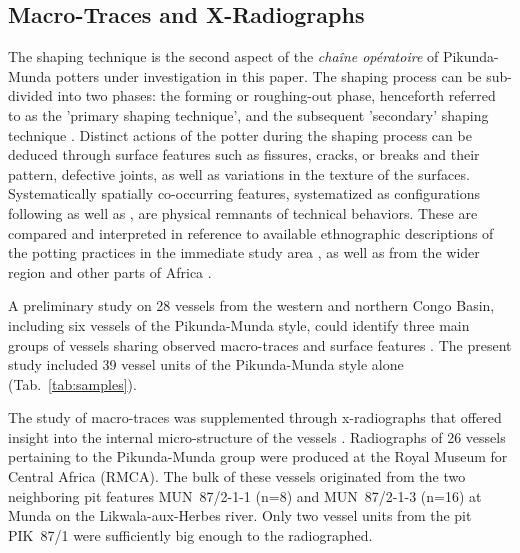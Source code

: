 \documentclass[smallextended,natbib]{svjour3}       %
\begin{document}
\subsection{Macro-Traces and X-Radiographs}

The shaping technique is the second aspect of the \textit{chaîne opératoire} of Pikunda-Munda potters under investigation in this paper. The shaping process can be sub-divided into two phases: the forming or roughing-out phase, henceforth referred to as the 'primary shaping technique', and the subsequent 'secondary' shaping technique \citep{Shepard.1956,Rye.1981,LivingstoneSmith.2007a,LivingstoneSmith.2010c}. Distinct actions of the potter during the shaping process can be deduced through surface features such as fissures, cracks, or breaks and their pattern, defective joints, as well as variations in the texture of the surfaces. Systematically spatially co-occurring features, systematized as configurations following \citet{LivingstoneSmith.2007a} as well as \citet{LivingstoneSmith.2010c}, are physical remnants of technical behaviors. These are compared and interpreted in reference to available ethnographic descriptions of the potting practices in the immediate study area \citep{Eggert.1980c,Eggert.inVorb.}, as well as from the wider region \citep{Gosselain.1992,Gosselain.2002,Gosselain.1997,LivingstoneSmith.2007b,LivingstoneSmith.2010a,LivingstoneSmith.2016,LivingstoneSmith.2009,LivingstoneSmith.2010c} and other parts of Africa \citep{Gallay.1998,GasparDaSilva.2005,Gosselain.2005,Gosselain.2006,LivingstoneSmith.2007a,Mayor.2011a,Gosselain.2014}.

A preliminary study on 28 vessels from the western and northern Congo Basin, including six vessels of the Pikunda-Munda style, could identify three main groups of vessels sharing observed macro-traces and surface features \citep[45--60,69--73]{Seidensticker.2021e}. The present study included 39 vessel units of the Pikunda-Munda style alone (Tab.~\ref{tab:samples}).

The study of macro-traces was supplemented through x-radiographs that offered insight into the internal micro-structure of the vessels \citep{Stevenson.1953,Rye.1977,Vandiver.1987}. Radiographs of 26 vessels pertaining to the Pikunda-Munda group were produced at the Royal Museum for Central Africa (RMCA). The bulk of these vessels originated from the two neighboring pit features MUN~87/2-1-1 (n=8) and MUN~87/2-1-3 (n=16) at Munda on the Likwala-aux-Herbes river. Only two vessel units from the pit PIK~87/1 were sufficiently big enough to the radiographed.
\end{document}
